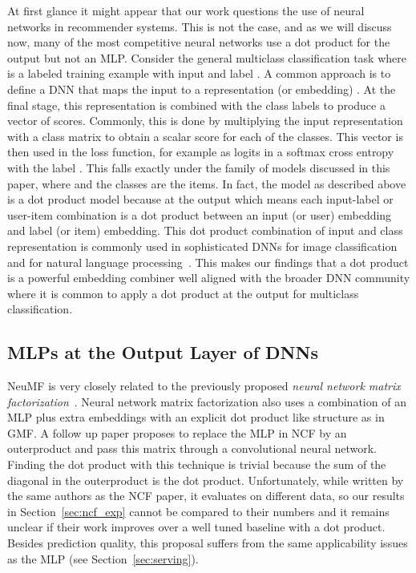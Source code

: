 \documentclass{article}
\begin{document}
\label{sec:dnn}
At first glance it might appear that our work questions the use of neural networks in recommender systems.
This is not the case, and as we will discuss now, many of the most competitive neural networks use a dot product for the output but not an MLP.
Consider the general multiclass classification task where  is a labeled training example with input  and label .
A common approach is to define a DNN  that maps the input  to a representation (or embedding) .
At the final stage, this representation is combined with the class labels to produce a vector of scores.
Commonly, this is done by multiplying the input representation  with a class matrix  to obtain a scalar score for each of the  classes.
This vector is then used in the loss function, for example as logits in a softmax cross entropy with the label .
This falls exactly under the family of models discussed in this paper, where  and the classes are the items.
In fact, the model as described above is a dot product model because at the output  which means each input-label or user-item combination is a dot product between an input (or user) embedding and label (or item) embedding.
This dot product combination of input and class representation is commonly used in sophisticated DNNs for image classification~\cite{alexnet-2012,he:cvpr16} and for natural language processing~\cite{bengio2003neural,mikolov2013distributed,devlin:arxiv18}.
This makes our findings that a dot product is a powerful embedding combiner well aligned with the broader DNN community where it is common to apply a dot product at the output for multiclass classification.

\subsection{MLPs at the Output Layer of DNNs}

NeuMF is very closely related to the previously proposed \emph{neural network matrix factorization}~\cite{dziugaite:arxiv15}.
Neural network matrix factorization also uses a combination of an MLP plus extra embeddings with an explicit dot product like structure as in GMF.
A follow up paper \cite{he:ijcai18} proposes to replace the MLP in NCF by an outerproduct and pass this matrix through a convolutional neural network.
Finding the dot product with this technique is trivial because the sum of the diagonal in the outerproduct is the dot product.
Unfortunately, while written by the same authors as the NCF paper, it evaluates on different data, so our results in Section~\ref{sec:ncf_exp} cannot be compared to their numbers and it remains unclear if their work improves over a well tuned baseline with a dot product.
Besides prediction quality, this proposal suffers from the same applicability issues as the MLP (see Section~\ref{sec:serving}).
\end{document}
